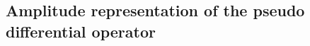 \documentclass[12pt,a4paper,reqno]{amsproc}
\theoremstyle{definition}
\theoremstyle{remark}
\numberwithin{equation}{section}
\begin{document}
\subsection{Amplitude representation of the pseudo differential operator} \label{C7-SS3}
\end{document}
